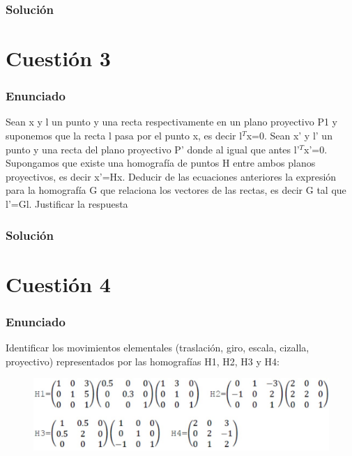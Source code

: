 \subsubsection{Solución}




\section{Cuestión 3}

\subsubsection{Enunciado}

Sean x y l un punto y una recta respectivamente en un plano proyectivo P1 y suponemos que la recta l pasa por el punto x, es decir l$^{T}$x=0. Sean x' y l' un punto y una recta del plano proyectivo P' donde al igual que antes l'$^{T}$x'=0.
Supongamos que existe una homografía de puntos H entre ambos planos proyectivos, es decir x'=Hx. Deducir de las ecuaciones anteriores la expresión para la homografía G que relaciona los vectores de las rectas, es decir G tal que l'=Gl. Justificar la respuesta


\subsubsection{Solución}


\section{Cuestión 4}

\subsubsection{Enunciado}

Identificar los movimientos elementales (traslación, giro, escala, cizalla, proyectivo) representados por las homografías H1, H2, H3 y H4:

\begin{figure}[H]
\centering
\includegraphics[width=1\linewidth]{Screenshot_1}
\label{fig:screenshot1}
\end{figure}


